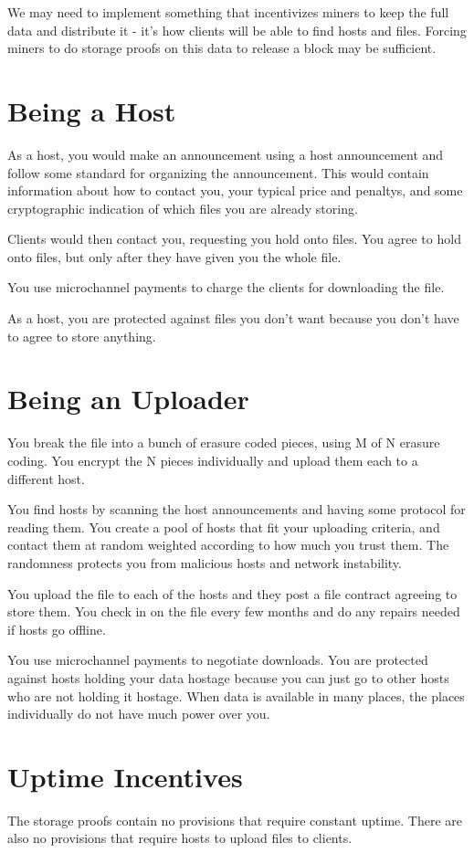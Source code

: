 \documentclass[twocolumn]{article}
\begin{document}
We may need to implement something that incentivizes miners to keep the full data and distribute it - it's how clients will be able to find hosts and files.
Forcing miners to do storage proofs on this data to release a block may be sufficient.

\section{Being a Host}
As a host, you would make an announcement using a host announcement and follow some standard for organizing the announcement.
This would contain information about how to contact you, your typical price and penaltys, and some cryptographic indication of which files you are already storing.

Clients would then contact you, requesting you hold onto files.
You agree to hold onto files, but only after they have given you the whole file.

You use microchannel payments to charge the clients for downloading the file.

As a host, you are protected against files you don't want because you don't have to agree to store anything.

\section{Being an Uploader}
You break the file into a bunch of erasure coded pieces, using M of N erasure coding.
You encrypt the N pieces individually and upload them each to a different host.

You find hosts by scanning the host announcements and having some protocol for reading them.
You create a pool of hosts that fit your uploading criteria, and contact them at random weighted according to how much you trust them.
The randomness protects you from malicious hosts and network instability.

You upload the file to each of the hosts and they post a file contract agreeing to store them.
You check in on the file every few months and do any repairs needed if hosts go offline.

You use microchannel payments to negotiate downloads.
You are protected against hosts holding your data hostage because you can just go to other hosts who are not holding it hostage.
When data is available in many places, the places individually do not have much power over you.

\section{Uptime Incentives}
The storage proofs contain no provisions that require constant uptime.
There are also no provisions that require hosts to upload files to clients.
\end{document}
